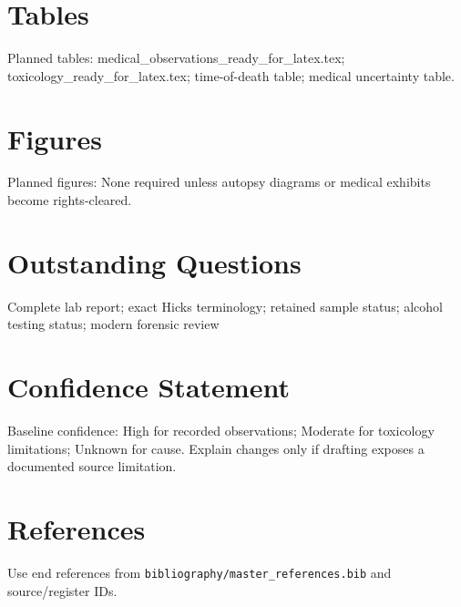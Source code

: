 \section{Tables}
Planned tables: medical_observations_ready_for_latex.tex; toxicology_ready_for_latex.tex; time-of-death table; medical uncertainty table.

\section{Figures}
Planned figures: None required unless autopsy diagrams or medical exhibits become rights-cleared.

\section{Outstanding Questions}
Complete lab report; exact Hicks terminology; retained sample status; alcohol testing status; modern forensic review

\section{Confidence Statement}
Baseline confidence: High for recorded observations; Moderate for toxicology limitations; Unknown for cause. Explain changes only if drafting exposes a documented source limitation.

\section{References}
Use end references from \texttt{bibliography/master_references.bib} and source/register IDs.
